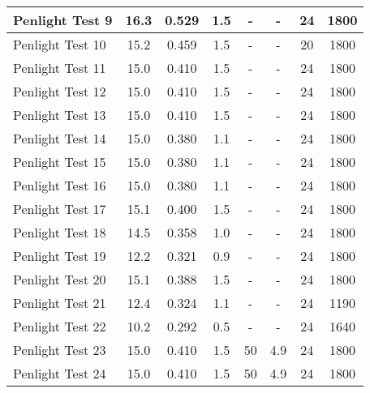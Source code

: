 \begin{table}[!ht]
\begin{center}
\begin{tabular}{|l|c|c|c|c|c|c|c|}
Penlight Test 9   &  16.3      &  0.529        &  1.5        &  -         &  -          &  24           &  1800       \\ \hline
Penlight Test 10  &  15.2      &  0.459        &  1.5        &  -         &  -          &  20           &  1800       \\ \hline
Penlight Test 11  &  15.0      &  0.410        &  1.5        &  -         &  -          &  24           &  1800       \\ \hline
Penlight Test 12  &  15.0      &  0.410        &  1.5        &  -         &  -          &  24           &  1800       \\ \hline
Penlight Test 13  &  15.0      &  0.410        &  1.5        &  -         &  -          &  24           &  1800       \\ \hline
Penlight Test 14  &  15.0      &  0.380        &  1.1        &  -         &  -          &  24           &  1800       \\ \hline
Penlight Test 15  &  15.0      &  0.380        &  1.1        &  -         &  -          &  24           &  1800       \\ \hline
Penlight Test 16  &  15.0      &  0.380        &  1.1        &  -         &  -          &  24           &  1800       \\ \hline
Penlight Test 17  &  15.1      &  0.400        &  1.5        &  -         &  -          &  24           &  1800       \\ \hline
Penlight Test 18  &  14.5      &  0.358        &  1.0        &  -         &  -          &  24           &  1800       \\ \hline
Penlight Test 19  &  12.2      &  0.321        &  0.9        &  -         &  -          &  24           &  1800       \\ \hline
Penlight Test 20  &  15.1      &  0.388        &  1.5        &  -         &  -          &  24           &  1800       \\ \hline
Penlight Test 21  &  12.4      &  0.324        &  1.1        &  -         &  -          &  24           &  1190       \\ \hline
Penlight Test 22  &  10.2      &  0.292        &  0.5        &  -         &  -          &  24           &  1640       \\ \hline
Penlight Test 23  &  15.0      &  0.410        &  1.5        &  50        &  4.9        &  24           &  1800       \\ \hline
Penlight Test 24  &  15.0      &  0.410        &  1.5        &  50        &  4.9        &  24           &  1800       \\ \hline

\end{tabular}
\end{center}
\end{table}
